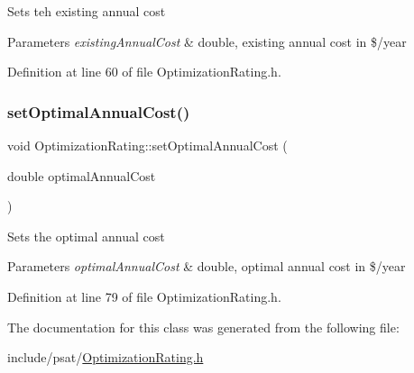 Sets teh existing annual cost


\begin{DoxyParams}{Parameters}
{\em existing\+Annual\+Cost} & double, existing annual cost in \$/year \\
\hline
\end{DoxyParams}


Definition at line 60 of file Optimization\+Rating.\+h.

\mbox{\label{class_optimization_rating_a4651985a899b2bff18e8356a42c2d37f}} 
\subsubsection{\texorpdfstring{set\+Optimal\+Annual\+Cost()}{setOptimalAnnualCost()}}
{\footnotesize\ttfamily void Optimization\+Rating\+::set\+Optimal\+Annual\+Cost (\begin{DoxyParamCaption}\item[{double}]{optimal\+Annual\+Cost }\end{DoxyParamCaption})\hspace{0.3cm}{\ttfamily [inline]}}

Sets the optimal annual cost


\begin{DoxyParams}{Parameters}
{\em optimal\+Annual\+Cost} & double, optimal annual cost in \$/year \\
\hline
\end{DoxyParams}


Definition at line 79 of file Optimization\+Rating.\+h.



The documentation for this class was generated from the following file\+:\begin{DoxyCompactItemize}
\item 
include/psat/\hyperlink{_optimization_rating_8h}{Optimization\+Rating.\+h}\end{DoxyCompactItemize}
